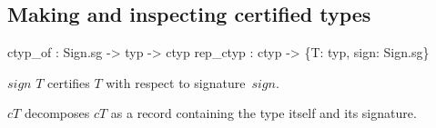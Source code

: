 \subsection{Making and inspecting certified types}
\begin{ttbox} 
ctyp_of  : Sign.sg -> typ -> ctyp
rep_ctyp : ctyp -> \{T: typ, sign: Sign.sg\}
\end{ttbox}
\begin{ttdescription}
\item[\ttindexbold{ctyp_of} $sign$ $T$] 
certifies $T$ with respect to signature~$sign$.

\item[\ttindexbold{rep_ctyp} $cT$] 
decomposes $cT$ as a record containing the type itself and its signature.
\end{ttdescription}

